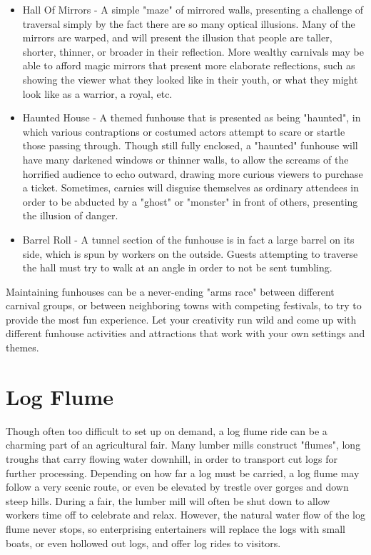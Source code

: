 \documentclass[10pt,a4paper,twoside,twocolumn,openany,bg=print,nodeprecatedcode]{dndbook}
\begin{document}
\begin{itemize}
\item Hall Of Mirrors - A simple "maze" of mirrored walls, presenting a challenge of traversal simply by the fact there are so many optical illusions. Many of the mirrors are warped, and will present the illusion that people are taller, shorter, thinner, or broader in their reflection. More wealthy carnivals may be able to afford magic mirrors that present more elaborate reflections, such as showing the viewer what they looked like in their youth, or what they might look like as a warrior, a royal, etc.
\item Haunted House - A themed funhouse that is presented as being "haunted", in which various contraptions or costumed actors attempt to scare or startle those passing through. Though still fully enclosed, a "haunted" funhouse will have many darkened windows or thinner walls, to allow the screams of the horrified audience to echo outward, drawing more curious viewers to purchase a ticket. Sometimes, carnies will disguise themselves as ordinary attendees in order to be abducted by a "ghost" or "monster" in front of others, presenting the illusion of danger.
\item Barrel Roll - A tunnel section of the funhouse is in fact a large barrel on its side, which is spun by workers on the outside. Guests attempting to traverse the hall must try to walk at an angle in order to not be sent tumbling.
\end{itemize}

Maintaining funhouses can be a never-ending "arms race" between different carnival groups, or between neighboring towns with competing festivals, to try to provide the most fun experience. Let your creativity run wild and come up with different funhouse activities and attractions that work with your own settings and themes.
\section{Log Flume}
Though often too difficult to set up on demand, a log flume ride can be a charming part of an agricultural fair. Many lumber mills construct "flumes", long troughs that carry flowing water downhill, in order to transport cut logs for further processing. Depending on how far a log must be carried, a log flume may follow a very scenic route, or even be elevated by trestle over gorges and down steep hills.
During a fair, the lumber mill will often be shut down to allow workers time off to celebrate and relax. However, the natural water flow of the log flume never stops, so enterprising entertainers will replace the logs with small boats, or even hollowed out logs, and offer log rides to visitors.
\end{document}
